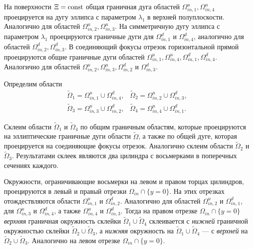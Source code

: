 На поверхности $\Xi = \mathrm{const}$ общая граничная дуга областей $\Omega_{in, 1}^u, \Omega_{in, 4}^u$ проецируется на дугу эллипса с параметром $\lambda_1$ в верхней полуплоскости. Аналогично для областей $\Omega_{in, 2}^u, \Omega_{in, 3}^u$. На симметричную дугу эллипса с параметром $\lambda_1$ проецируются граничные дуги для $\Omega_{in, 1}^d$ и $\Omega_{in, 4}^d$, аналогично для областей $\Omega_{in, 2}^d, \Omega_{in, 3}^d$. 
В соединяющий фокусы отрезок горизонтальной прямой проецируются общие граничные дуги областей $\Omega_{in, 1}^u, \Omega_{in, 4}^u, \Omega_{in, 1}^d, \Omega_{in, 4}^d$. Аналогично для областей $\Omega_{in, 2}^u, \Omega_{in, 3}^u, \Omega_{in, 2}^d$ и $\Omega_{in, 3}^d$.

Определим области 
\begin{equation}
\begin{array}{cc}
\widetilde{\Omega}_1 = \Omega_{in, 1}^u \cup \Omega_{in, 4}^d, &
\widetilde{\Omega}_2 = \Omega_{in, 2}^u \cup \Omega_{in, 3}^d, \\
\widetilde{\Omega}_3 = \Omega_{in, 3}^u \cup \Omega_{in, 2}^d, &
\widetilde{\Omega}_4 = \Omega_{in, 4}^u \cup \Omega_{in, 1}^d.
\end{array}
\label{eq:case7Omegas}
\end{equation}

Склеим области $\widetilde{\Omega}_1$ и $\widetilde{\Omega}_4$ по общим граничным областям, которые проецируются на эллиптические граничные дуги области $\widetilde{\Omega}$, а также по общей дуге, которая проецируется на соединяющие фокусы отрезок.
Аналогично склеим области $\widetilde{\Omega}_2$ и $\widetilde{\Omega}_3$. Результатами склеек являются два цилиндра с восьмерками в поперечных сечениях каждого.

Окружности, ограничивающие восьмерки на левом и правом торцах цилиндров, проецируются в левый и правый отрезки $\Omega_{in} \cap \{y=0\}$.
На этих отрезках отождествляются области $\Omega_{in, 1}^u$ и $\Omega_{in, 2}^d$. Аналогично для областей $\Omega_{in, 2}^u$ и $\Omega_{in, 1}^d$, для $\Omega_{in, 3}^u$ и $\Omega_{in, 4}^d$, а также $\Omega_{in, 4}^u$ и $\Omega_{in, 3}^d$.
Тогда на правом отрезке $\Omega_{in} \cap \{y=0\}$ \textit{верхняя} граничная окружность склейки $\widetilde{\Omega}_1 \cup \widetilde{\Omega}_4$ склеивается с  \textit{нижней} граничной окружностью склейки $\widetilde{\Omega}_2 \cup \widetilde{\Omega}_3$, а \textit{нижняя} окружность на  $\widetilde{\Omega}_1 \cup \widetilde{\Omega}_4$ --- с \textit{верхней} на $\widetilde{\Omega}_2 \cup \widetilde{\Omega}_3$. Аналогично на левом отрезке $\Omega_{in} \cap \{y=0\}$.

